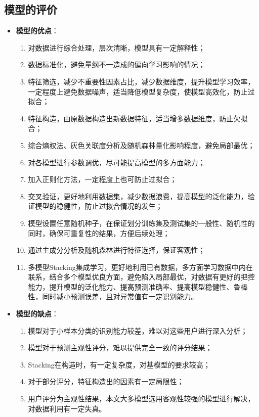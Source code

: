 \documentclass{MathorCupmodeling}
\begin{document}
	\subsection{模型的评价}
	\begin{itemize}
		\item \textbf{模型的优点}：
			\begin{enumerate}
				\item 对数据进行综合处理，层次清晰，模型具有一定解释性；
				\item 数据标准化，避免量纲不一造成的偏向学习影响的情况；
				\item 特征筛选，减少不重要性因素占比，减少数据维度，提升模型学习效率，一定程度上避免数据噪声，适当降低模型复杂度，使模型高效化，防止过拟合；
				\item 特征构造，由原数据构造出新数据特征，适当增多数据维度，防止欠拟合；
				\item 综合熵权法、灰色关联度分析及随机森林量化影响程度，避免局部最优；
				\item 对各模型进行参数调优，尽可能提高模型的多方面能力；
				\item 加入正则化方法，一定程度上也可防止过拟合；
				\item 交叉验证，更好地利用数据集，减少数据浪费，提高模型的泛化能力，验证模型的稳健性，防止过拟合情况的发生；
				\item 模型设置任意随机种子，在保证划分训练集及测试集的一般性、随机性的同时，确保可重复性的结果，方便后续处理；
				\item 通过主成分分析及随机森林进行特征选择，保证客观性；
				\item 多模型Stacking集成学习，更好地利用已有数据，多方面学习数据中内在联系，结合多个模型优良方面，避免陷入局部最优，对数据有更好的把控能力，提升模型的泛化能力、提高预测准确率、提高模型稳健性、鲁棒性，同时减小预测误差，且对异常值有一定识别能力。
			\end{enumerate}
		\item \textbf{模型的缺点}：
			\begin{enumerate}
				\item 模型对于小样本分类的识别能力较差，难以对这些用户进行深入分析；
				\item 模型对于预测主观性评分，难以提供完全一致的评分结果；
				\item Stacking在构造时，有一定复杂度，对基模型的要求较高；
				\item 对于部分评分，特征构造出的因素有一定局限性；
				\item 用户评分为主观性结果，本文大多模型选用客观性较强的模型进行解决，对数据利用有一定失真。

\end{enumerate}
\end{itemize}
\end{document}
